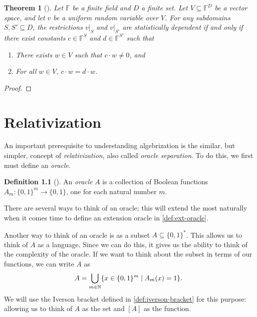 \documentclass[english,12pt]{reedthesis}
\theoremstyle{plain}
\newtheorem{thm}{Theorem}[section]
\theoremstyle{definition}
\newtheorem{defn}[defn]{Definition}
\theoremstyle{remark}
\begin{document}
\begin{thm}[{\cite[Claim 2]{CFGS22}}]\label{thm:lin-indep-stat-indep}
  Let $\mathbb{F}$ be a finite field and $D$ a finite set. Let
  $V \subseteq \mathbb{F}^{D}$ be a vector space, and let $v$ be a uniform random
  variable over $V$. For any subdomains $S, S' \subseteq D$, the restrictions $v|_{S}$
  and $v|_{S'}$ are statistically dependent if and only if there exist constants
  $c \in \mathbb{F}^{S}$ and $d \in \mathbb{F}^{S'}$ such that
  \begin{enumerate}
    \item There exists $w \in V$ such that $c \cdot w \ne 0$, and
    \item For all $w \in V$, $c \cdot w = d \cdot w$.
  \end{enumerate}
\end{thm}

\begin{proof}
\end{proof}

\chapter{Relativization}


An important prerequisite to understanding algebrization is the similar, but
simpler, concept of \emph{relativization}, also called \emph{oracle separation}.
To do this, we first must define an \emph{oracle}.
\begin{defn}[{\cite[Def.\ 2.1]{AW09}}]\label{def:oracle}
  An \emph{oracle} $A$ is a collection of Boolean functions
  $A_{m}\colon \{0, 1\}^{m} \rightarrow \{0, 1\}$, one for each natural number $m$.
\end{defn}
There are several ways to think of an oracle; this will extend the most
naturally when it comes time to define an extension oracle in
\cref{def:ext-oracle}.

Another way to think of an oracle is as a subset $A \subseteq \{0, 1\}^{*}$. This allows
us to think of $A$ as a language. Since we can do this, it gives us the ability
to think of the complexity of the oracle. If we want to think about the subset
in terms of our functions, we can write $A$ as
\begin{equation}
  A = \bigcup_{m \in \mathbb{N}}\mleft\{x \in \{0, 1\}^{m} \mid A_{m}(x) = 1\mright\}.
\end{equation}
We will use the Iverson bracket defined in \cref{def:iverson-bracket} for this
purpose: allowing us to think of $A$ as the set and $[A]$ as the function.
\end{document}
